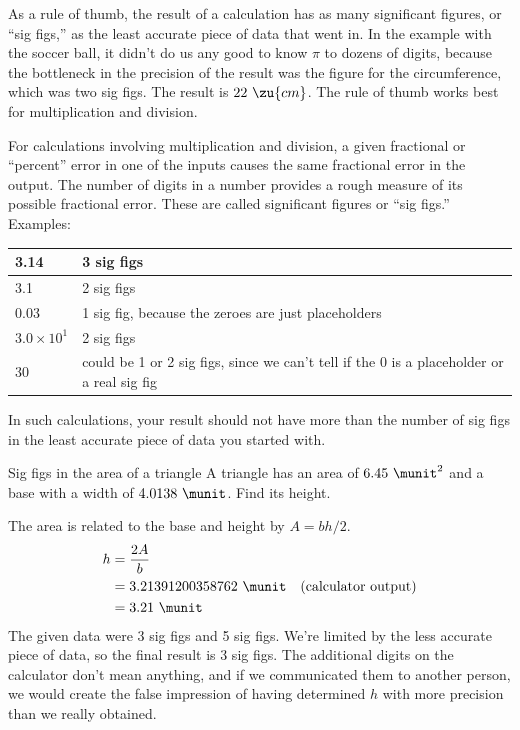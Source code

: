 As a rule of thumb, the result of a calculation has as many significant
figures, or ``sig figs,'' as the least accurate piece of data that went
in. In the example with the soccer ball, it didn't do us any good to know
$\pi$ to dozens of digits, because the bottleneck in the precision of the
result was the figure for the circumference, which was two sig figs.
The result is $22\ \zu{cm}$.
The rule of thumb works best for multiplication and division.

\enlargethispage{-2\baselineskip}

For calculations involving multiplication and division,
a given fractional or ``percent'' error in one of the inputs
causes the same fractional error in the output. The number of
digits in a number provides a rough measure of its possible
fractional error. These are called significant figures
or ``sig figs.'' Examples:

\begin{tabular}{|l|p{80mm}|}
\hline
3.14 & 3 sig figs \\
\hline
3.1  & 2 sig figs \\
\hline
0.03 & 1 sig fig, because the zeroes are just placeholders \\
\hline
$3.0\times10^1$ & 2 sig figs \\
\hline
30   & could be 1 or 2 sig figs, since we can't tell if the 0 is a placeholder or a real sig fig \\
\hline
\end{tabular}

\noindent In such calculations, your result should not
have more than the number of sig figs in the least accurate
piece of data you started with.

\enlargethispage{-2\baselineskip}

\begin{eg}{Sig figs in the area of a triangle}
\egquestion A triangle has an area of $6.45\ \munit^2$ and a base
with a width of $4.0138\ \munit$. Find its height.

\eganswer The area is related to the base and height by
$A=bh/2$.
\begin{align*}
  h &= \frac{2A}{b} \\
    &= 3.21391200358762\ \munit \quad \text{(calculator output)} \\
    &= 3.21\ \munit
\end{align*}
The given data were 3 sig figs and 5 sig figs. We're limited by the
less accurate piece of data, so the final result is 3 sig figs.
The additional digits on the calculator don't mean anything, and
if we communicated them to another person, we would create the false
impression of having determined $h$ with more precision than we really obtained.
\end{eg}


